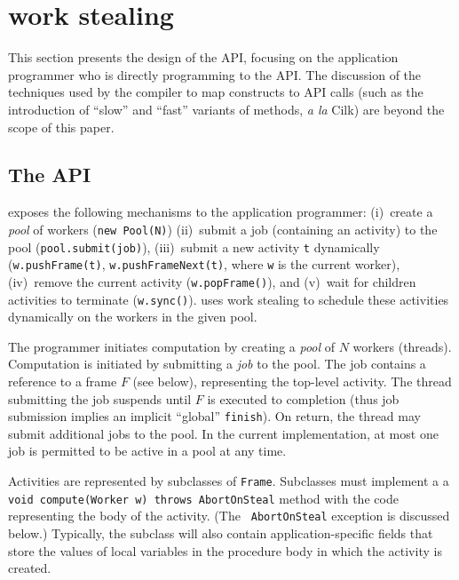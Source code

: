 \section{\Xten{} work stealing}\label{sec:XWS}
This section presents the design of the \XWS{} API, focusing on
the application programmer who is directly programming to the API. The
discussion of the techniques used by the \Xten{} compiler to map
\Xten{} constructs to \XWS{} API calls (such as the introduction of
``slow'' and ``fast'' variants of methods, {\em a la} Cilk) are beyond
the scope of this paper.

\subsection{The \XWS{} API}
\XWS{} exposes the following mechanisms to the application programmer:
(i)~create a {\em pool} of workers ({\tt new Pool(N)}) (ii)~submit a
job (containing an activity) to the pool ({\tt pool.submit(job)}),
(iii)~submit a new activity {\tt t} dynamically ({\tt w.pushFrame(t)},
{\tt w.pushFrameNext(t)}, where {\tt w} is the current worker),
(iv)~remove the current activity ({\tt w.popFrame()}), and (v)~wait
for children activities to terminate ({\tt w.sync()}).  \XWS{} uses
work stealing to schedule these activities dynamically on the workers
in the given pool.


The programmer initiates computation by creating a {\em pool} of $N$
workers (threads).  Computation is initiated by submitting a {\em job}
to the pool. The job contains a reference to a frame $F$ (see below),
representing the top-level activity.  The thread submitting the job
suspends until $F$ is executed to completion (thus job submission
implies an implicit ``global'' {\tt finish}). On return, the thread
may submit additional jobs to the pool. In the current implementation,
at most one job is permitted to be active in a pool at any time.

Activities are represented by subclasses of {\tt Frame}. Subclasses
must implement a a {\tt void compute(Worker w) throws AbortOnSteal}
method with the code representing the body of the activity.  (The {\tt
AbortOnSteal} exception is discussed below.) Typically, the subclass
will also contain application-specific fields that store the values of
local variables in the procedure body in which the activity is
created. 

